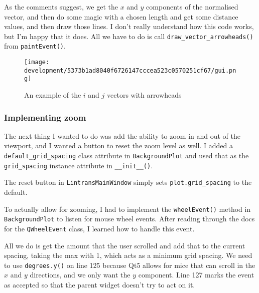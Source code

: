 \documentclass[../main.tex]{subfiles}
\begin{document}

As the comments suggest, we get the $x$ and $y$ components of the normalised vector, and then do some magic with a chosen length and get some distance values, and then draw those lines. I don't really understand how this code works, but I'm happy that it does. All we have to do is call \texttt{draw\_vector\_arrowheads()} from \texttt{paintEvent()}.

\begin{figure}[H]
	\centering
	\texttt{[image: development/5373b1ad8040f6726147cccea523c0570251cf67/gui.png]}
	\caption{An example of the $i$ and $j$ vectors with arrowheads}
	\label{fig:development:5373b1ad8040f6726147cccea523c0570251cf67:gui.png}
\end{figure}

\subsubsection{Implementing zoom\label{development:improving-the-gui:implementing-zoom}}

The next thing I wanted to do was add the ability to zoom in and out of the viewport, and I wanted a button to reset the zoom level as well. I added a \texttt{default\_grid\_spacing} class attribute in \texttt{BackgroundPlot} and used that as the \texttt{grid\_spacing} instance attribute in \texttt{\_\_init\_\_()}.


The reset button in \texttt{LintransMainWindow} simply sets \texttt{plot.grid\_spacing} to the default.

To actually allow for zooming, I had to implement the \texttt{wheelEvent()} method in \texttt{BackgroundPlot} to listen for mouse wheel events. After reading through the docs for the \texttt{QWheelEvent} class\cite{qt5-docs-qwheelevent}, I learned how to handle this event.


All we do is get the amount that the user scrolled and add that to the current spacing, taking the max with 1, which acts as a minimum grid spacing. We need to use \texttt{degrees.y()} on line 125 because Qt5 allows for mice that can scroll in the $x$ and $y$ directions, and we only want the $y$ component. Line 127 marks the event as accepted so that the parent widget doesn't try to act on it.
\end{document}
